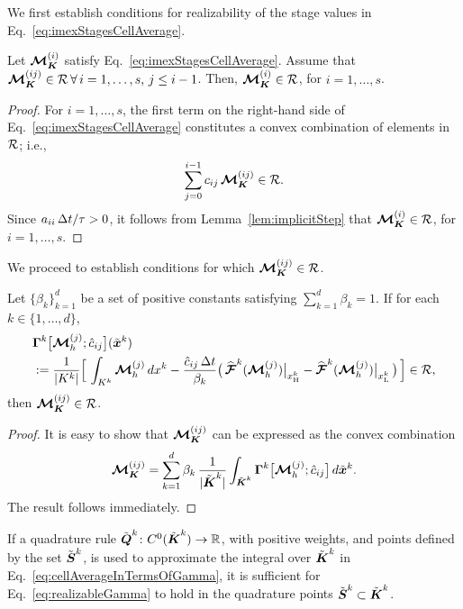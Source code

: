 We first establish conditions for realizability of the stage values in Eq.~\eqref{eq:imexStagesCellAverage}.  
\begin{lemma}
  Let $\boldsymbol{\mathcal{M}}_{\boldsymbol{K}}^{(i)}$ satisfy Eq.~\eqref{eq:imexStagesCellAverage}.
  Assume that $\boldsymbol{\mathcal{M}}_{\boldsymbol{K}}^{(ij)}\in\mathcal{R}\,\forall\,i=1,\ldots,s,\,j\le i-1$.  
  Then, $\boldsymbol{\mathcal{M}}_{\boldsymbol{K}}^{(i)}\in\mathcal{R}$, for $i=1,\ldots,s$.  
  \label{lem:imexStagesCellAverage}
\end{lemma}
\begin{proof}
  For $i=1,\ldots,s$, the first term on the right-hand side of Eq.~\eqref{eq:imexStagesCellAverage} constitutes a convex combination of elements in $\mathcal{R}$; i.e.,
  \begin{equation*}
    \sum_{j=0}^{i-1}c_{ij}\,\boldsymbol{\mathcal{M}}_{\boldsymbol{K}}^{(ij)}\in\mathcal{R}.
  \end{equation*}
  Since $a_{ii}\,\Delta t/\tau>0$, it follows from Lemma~\ref{lem:implicitStep} that $\boldsymbol{\mathcal{M}}_{\boldsymbol{K}}^{(i)}\in\mathcal{R}$, for $i=1,\ldots,s$.  
\end{proof}

We proceed to establish conditions for which $\boldsymbol{\mathcal{M}}_{\boldsymbol{K}}^{(ij)}\in\mathcal{R}$.  
\begin{lemma}
  Let $\{\beta_{k}\}_{k=1}^{d}$ be a set of positive constants satisfying $\sum_{k=1}^{d}\beta_{k}=1$.  
  If for each $k\in\{1,\ldots,d\}$, 
  \begin{align}
    &\boldsymbol{\Gamma}^{k}\big[\boldsymbol{\mathcal{M}}_{h}^{(j)};\hat{c}_{ij}\big](\tilde{\boldsymbol{x}}^{k}) \label{eq:realizableGamma} \\
    &:=\frac{1}{|K^{k}|}
    \Big[\,\int_{K^{k}}\boldsymbol{\mathcal{M}}_{h}^{(j)}\,dx^{k}-\frac{\hat{c}_{ij}\,\Delta t}{\beta_{k}}\big(\,\widehat{\boldsymbol{\mathcal{F}}}^{k}(\boldsymbol{\mathcal{M}}_{h}^{(j)})\big|_{x_{\mbox{\tiny H}}^{k}}-\widehat{\boldsymbol{\mathcal{F}}}^{k}(\boldsymbol{\mathcal{M}}_{h}^{(j)})\big|_{x_{\mbox{\tiny L}}^{k}}\,\big)\,\Big]\in\mathcal{R}, \nonumber    
  \end{align}
  then $\boldsymbol{\mathcal{M}}_{\boldsymbol{K}}^{(ij)}\in\mathcal{R}$.  
  \label{lem:realizableMij}
\end{lemma}
\begin{proof}
  It is easy to show that $\boldsymbol{\mathcal{M}}_{\boldsymbol{K}}^{(ij)}$ can be expressed as the convex combination
  \begin{equation}
    \boldsymbol{\mathcal{M}}_{\boldsymbol{K}}^{(ij)}
    =\sum_{k=1}^{d}\beta_{k}\,\frac{1}{|\tilde{\boldsymbol{\boldsymbol{K}}}^{k}|}\int_{\tilde{\boldsymbol{K}}^{k}}\boldsymbol{\Gamma}^{k}\big[\boldsymbol{\mathcal{M}}_{h}^{(j)};\hat{c}_{ij}\big]\,d\tilde{\boldsymbol{x}}^{k}.  
    \label{eq:cellAverageInTermsOfGamma}
  \end{equation}
  The result follows immediately.  
\end{proof}
\begin{rem}
  If a quadrature rule $\tilde{\boldsymbol{Q}}^{k}\colon C^{0}(\tilde{\boldsymbol{K}}^{k})\to\mathbb{R}$, with positive weights, and points defined by the set $\tilde{\boldsymbol{S}}^{k}$, is used to approximate the integral over $\tilde{\boldsymbol{K}}^{k}$ in Eq.~\eqref{eq:cellAverageInTermsOfGamma}, it is sufficient for Eq.~\eqref{eq:realizableGamma} to hold in the quadrature points $\tilde{\boldsymbol{S}}^{k}\subset\tilde{\boldsymbol{K}}^{k}$.  
\end{rem}

